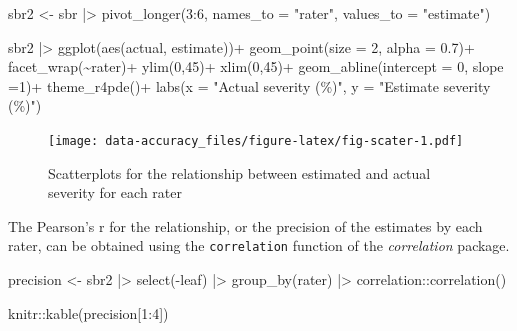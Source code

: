 \documentclass[
  letterpaper,
]{book}
\newenvironment{Shaded}{\begin{snugshade}}{\end{snugshade}}
\newcommand{\AttributeTok}[1]{\textcolor[rgb]{0.40,0.45,0.13}{#1}}
\newcommand{\DecValTok}[1]{\textcolor[rgb]{0.68,0.00,0.00}{#1}}
\newcommand{\FloatTok}[1]{\textcolor[rgb]{0.68,0.00,0.00}{#1}}
\newcommand{\FunctionTok}[1]{\textcolor[rgb]{0.28,0.35,0.67}{#1}}
\newcommand{\NormalTok}[1]{\textcolor[rgb]{0.00,0.23,0.31}{#1}}
\newcommand{\OtherTok}[1]{\textcolor[rgb]{0.00,0.23,0.31}{#1}}
\newcommand{\SpecialCharTok}[1]{\textcolor[rgb]{0.37,0.37,0.37}{#1}}
\newcommand{\StringTok}[1]{\textcolor[rgb]{0.13,0.47,0.30}{#1}}
\begin{document}
\begin{Shaded}
\begin{Highlighting}[]
\NormalTok{sbr2 }\OtherTok{\textless{}{-}}\NormalTok{ sbr }\SpecialCharTok{|\textgreater{}} 
  \FunctionTok{pivot\_longer}\NormalTok{(}\DecValTok{3}\SpecialCharTok{:}\DecValTok{6}\NormalTok{, }\AttributeTok{names\_to =} \StringTok{"rater"}\NormalTok{,}
               \AttributeTok{values\_to =} \StringTok{"estimate"}\NormalTok{) }

\NormalTok{sbr2 }\SpecialCharTok{|\textgreater{}} 
  \FunctionTok{ggplot}\NormalTok{(}\FunctionTok{aes}\NormalTok{(actual, estimate))}\SpecialCharTok{+}
  \FunctionTok{geom\_point}\NormalTok{(}\AttributeTok{size =} \DecValTok{2}\NormalTok{, }\AttributeTok{alpha =} \FloatTok{0.7}\NormalTok{)}\SpecialCharTok{+}
  \FunctionTok{facet\_wrap}\NormalTok{(}\SpecialCharTok{\textasciitilde{}}\NormalTok{rater)}\SpecialCharTok{+}
  \FunctionTok{ylim}\NormalTok{(}\DecValTok{0}\NormalTok{,}\DecValTok{45}\NormalTok{)}\SpecialCharTok{+}
  \FunctionTok{xlim}\NormalTok{(}\DecValTok{0}\NormalTok{,}\DecValTok{45}\NormalTok{)}\SpecialCharTok{+}
  \FunctionTok{geom\_abline}\NormalTok{(}\AttributeTok{intercept =} \DecValTok{0}\NormalTok{, }\AttributeTok{slope =}\DecValTok{1}\NormalTok{)}\SpecialCharTok{+}
  \FunctionTok{theme\_r4pde}\NormalTok{()}\SpecialCharTok{+}
  \FunctionTok{labs}\NormalTok{(}\AttributeTok{x =} \StringTok{"Actual severity (\%)"}\NormalTok{,}
       \AttributeTok{y =} \StringTok{"Estimate severity (\%)"}\NormalTok{)}
\end{Highlighting}
\end{Shaded}

\begin{figure}

{\centering \texttt{[image: data-accuracy\_files/figure-latex/fig-scater-1.pdf]}

}

\caption{\label{fig-scater}Scatterplots for the relationship between
estimated and actual severity for each rater}

\end{figure}

The Pearson's r for the relationship, or the precision of the estimates
by each rater, can be obtained using the \texttt{correlation} function
of the \emph{correlation} package.

\begin{Shaded}
\begin{Highlighting}[]
\NormalTok{precision }\OtherTok{\textless{}{-}}\NormalTok{ sbr2 }\SpecialCharTok{|\textgreater{}} 
  \FunctionTok{select}\NormalTok{(}\SpecialCharTok{{-}}\NormalTok{leaf) }\SpecialCharTok{|\textgreater{}} 
  \FunctionTok{group\_by}\NormalTok{(rater) }\SpecialCharTok{|\textgreater{}} 
\NormalTok{  correlation}\SpecialCharTok{::}\FunctionTok{correlation}\NormalTok{() }

\NormalTok{knitr}\SpecialCharTok{::}\FunctionTok{kable}\NormalTok{(precision[}\DecValTok{1}\SpecialCharTok{:}\DecValTok{4}\NormalTok{])}
\end{Highlighting}
\end{Shaded}
\end{document}
